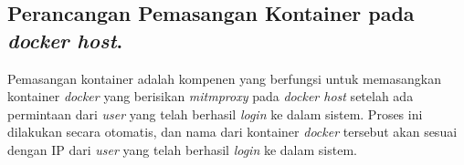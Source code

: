     \subsection{Perancangan Pemasangan Kontainer pada \textit{docker host}.}
	Pemasangan kontainer adalah kompenen yang berfungsi untuk memasangkan kontainer \textit{docker} yang berisikan \textit{mitmproxy} pada \textit{docker host} setelah ada permintaan dari \textit{user} yang telah berhasil \textit{login} ke dalam sistem. Proses ini dilakukan secara otomatis, dan nama dari kontainer \textit{docker} tersebut akan sesuai dengan IP dari \textit{user} yang telah berhasil \textit{login} ke dalam sistem.   

      